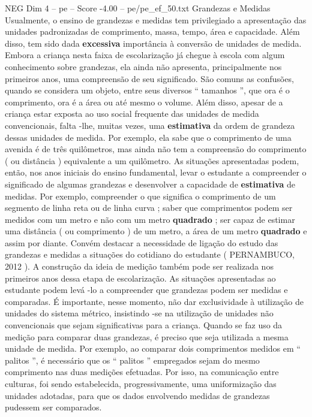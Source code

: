 \begin{textsample}{NEG Dim 4 – pe – Score -4.00 – pe/pe\_ef\_50.txt}  \label{ex:f4_neg_002}
Grandezas e Medidas Usualmente, o ensino de grandezas e medidas tem privilegiado a apresentação das unidades padronizadas de comprimento, massa, tempo, área e capacidade.
Além disso, tem sido dada \textbf{excessiva} importância à conversão de unidades de medida.
Embora a criança nesta faixa de escolarização já chegue à escola com algum conhecimento sobre grandezas, ela ainda não apresenta, principalmente nos primeiros anos, uma compreensão de seu significado.
São comuns as confusões, quando se considera um objeto, entre seus diversos “ tamanhos ”, que ora é o comprimento, ora é a área ou até mesmo o volume.
Além disso, apesar de a criança estar exposta ao uso social frequente das unidades de medida convencionais, falta -lhe, muitas vezes, uma \textbf{estimativa} da ordem de grandeza dessas unidades de medida.
Por exemplo, ela sabe que o comprimento de uma avenida é de três quilômetros, mas ainda não tem a compreensão do comprimento ( ou distância ) equivalente a um quilômetro.
As situações apresentadas podem, então, nos anos iniciais do ensino fundamental, levar o estudante a compreender o significado de algumas grandezas e desenvolver a capacidade de \textbf{estimativa} de medidas.
Por exemplo, compreender o que significa o comprimento de um segmento de linha reta ou de linha curva ; saber que comprimentos podem ser medidos com um metro e não com um metro \textbf{quadrado} ; ser capaz de estimar uma distância ( ou comprimento ) de um metro, a área de um metro \textbf{quadrado} e assim por diante.
Convém destacar a necessidade de ligação do estudo das grandezas e medidas a situações do cotidiano do estudante ( PERNAMBUCO, 2012 ).
A construção da ideia de medição também pode ser realizada nos primeiros anos dessa etapa de escolarização.
As situações apresentadas ao estudante podem levá -lo a compreender que grandezas podem ser medidas e comparadas.
É importante, nesse momento, não dar exclusividade à utilização de unidades do sistema métrico, insistindo -se na utilização de unidades não convencionais que sejam significativas para a criança.
Quando se faz uso da medição para comparar duas grandezas, é preciso que seja utilizada a mesma unidade de medida.
Por exemplo, ao comparar dois comprimentos medidos em “ palitos ”, é necessário que os “ palitos ” empregados sejam do mesmo comprimento nas duas medições efetuadas.
Por isso, na comunicação entre culturas, foi sendo estabelecida, progressivamente, uma uniformização das unidades adotadas, para que os dados envolvendo medidas de grandezas pudessem ser comparados.

\end{textsample}
